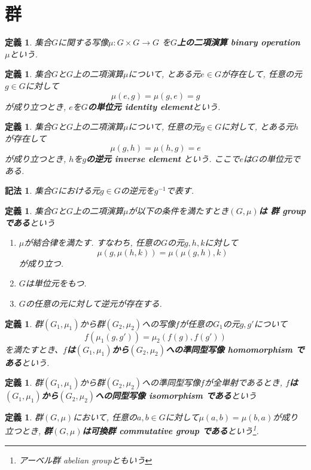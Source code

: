 \documentclass[dvipdfmx]{jsbook}
\theoremstyle{plain}
\newtheorem{Def}[thm]{定義}
\newtheorem{Notation}[thm]{記法}
\begin{document}
\section{群}
\begin{Def}
集合$G$に関する写像$\mu:G\times G\rightarrow G$
を{\bf $G$上の二項演算 binary operation $\mu$}という.
\end{Def}
\begin{Def}
集合$G$と$G$上の二項演算$\mu$について, とある元$e\in G$が存在して, 任意の元$g\in G$に対して\[\mu(e,g)=\mu(g,e)=g\]が成り立つとき, $e$を{\bf $G$の単位元 identity element}という.
\end{Def}
\begin{Def}
集合$G$と$G$上の二項演算$\mu$について, 任意の元$g\in G$に対して, とある元$h$が存在して \[\mu(g,h)=\mu(h,g)=e\]が成り立つとき, $h$を{\bf $g$の逆元 inverse element }という.
ここで$e$は$G$の単位元である.
\end{Def}
\begin{Notation}
集合$G$における元$g\in G$の逆元を$g^{-1}$で表す.
\end{Notation}
\begin{Def}
集合$G$と$G$上の二項演算$\mu$が以下の条件を満たすとき{\bf$(G,\mu)$は 群 group である}という
\begin{enumerate}
\item $\mu$が結合律を満たす. すなわち, 任意の$G$の元$g,h,k$に対して\[\mu(g,\mu(h,k))=\mu(\mu(g,h),k)\]が成り立つ.
\item $G$は単位元をもつ.
\item $G$の任意の元に対して逆元が存在する.
\end{enumerate}
\end{Def}
\begin{Def}
群$(G_1,\mu_1)$から群$(G_2,\mu_2)$への写像$f$が任意の$G_1$の元$g, g'$について \[f(\mu_1(g,g')) = \mu_2(f(g),f(g'))\] を満たすとき、{\bf $f$は$(G_1,\mu_1)$から$(G_2,\mu_2)$への準同型写像 homomorphism である}という.
\end{Def}
\begin{Def}
群$(G_1,\mu_1)$から群$(G_2,\mu_2)$への準同型写像$f$が全単射であるとき,
{\bf $f$は$(G_1,\mu_1)$から$(G_2,\mu_2)$への同型写像 isomorphism である}という
\end{Def}
\begin{Def}
群$(G,\mu)$において,
任意の$a,b\in G$に対して$\mu(a,b)=\mu(b,a)$が成り立つとき,
{\bf 群$(G,\mu)$は可換群 commutative group である}という\footnote{アーベル群 abelian groupともいう}.
\end{Def}
\begin{comment}
\begin{Def}
位相空間$X$と自然数$n$に対して次の手続きで決定されるアーベル群$H_n(X)$を{\bf$n$次 ホモロジー群}と呼ぶ

...

\end{Def}
\end{comment}
\end{document}

